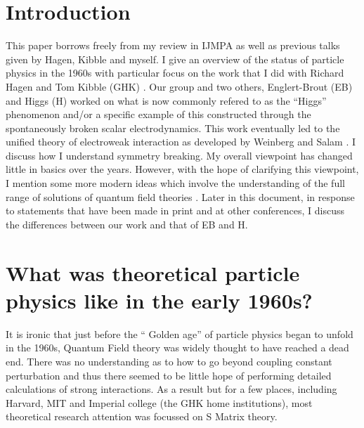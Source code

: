 \documentclass[preprintnumbers,12pt]{revtex4-2}
\begin{document}
\section{Introduction}\label{sec:0}
%
This paper borrows freely from my review in IJMPA \cite{gg;2009} as
well as previous talks given by Hagen, Kibble and myself. I give an
overview of the status of particle physics in the 1960s with
particular focus on the work that I did with Richard Hagen and Tom
Kibble (GHK) \cite{ghk;1964}. Our group and two others, Englert-Brout
(EB) \cite{eb;1964} and Higgs (H) \cite{phpl;1964,ph;1964} worked on
what is now commonly refered to as the ``Higgs'' phenomenon and/or a
specific example of this constructed through the spontaneously broken
scalar electrodynamics. This work eventually led to the unified theory
of electroweak interaction as developed by Weinberg and Salam
\cite{sw;1967,as;1967}. I discuss how I understand symmetry
breaking. My overall viewpoint has changed little in basics over
the years. However, with the hope of clarifying this viewpoint, I mention some
more modern ideas which involve the understanding of the full range of
solutions of quantum field theories \cite{ggg;1996,ggzg;2007}. Later
in this document, in response to statements that have been made in
print and at other conferences, I discuss the differences between our
work and that of EB and H.
%
\section{What was theoretical particle physics like in the early 1960s?} \label{sec:1}
%
It is ironic that just before the `` Golden age'' of particle physics
began to unfold in the 1960s, Quantum Field theory was widely thought
to have reached a dead end. There was no understanding as to how to go
beyond coupling constant perturbation and thus there seemed to be
little hope of performing detailed calculations of strong interactions. As a result but
for a few places, including Harvard, MIT and Imperial college (the GHK
home institutions), most theoretical research attention was focussed
on S Matrix theory.
\end{document}

